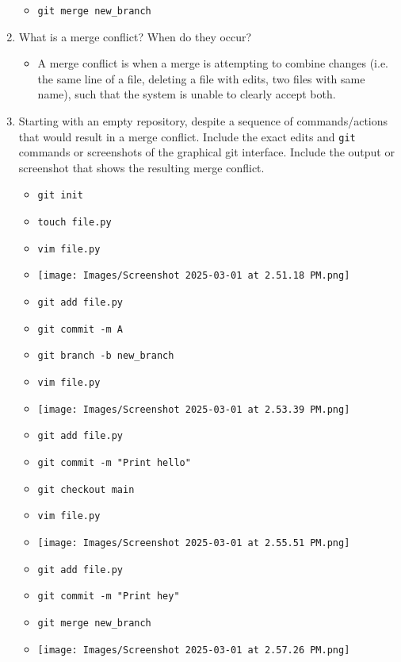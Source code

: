 \documentclass[10pt,twocolumn]{article}
\begin{document}
\begin{enumerate}
        \begin{itemize}
            \item \texttt{git merge new\_branch}
        \end{itemize}
    \item What is a merge conflict? When do they occur?
        \begin{itemize}
            \item A merge conflict is when a merge is attempting to combine changes (i.e. the same line of a file, deleting a file with edits, two files with same name), such that the system is unable to clearly accept both.
        \end{itemize}
    \item Starting with an empty repository, despite a sequence of commands/actions that would result in a merge conflict. Include the exact edits and \texttt{git} commands or screenshots of the graphical git interface. Include the output or screenshot that shows the resulting merge conflict.
        \begin{itemize}
            \item \texttt{git init}
            \item \texttt{touch file.py}
            \item \texttt{vim file.py}
            \item \texttt{[image: Images/Screenshot 2025-03-01 at 2.51.18 PM.png]}
            \item \texttt{git add file.py}
            \item \texttt{git commit -m A}
            \item \texttt{git branch -b new\_branch}
            \item \texttt{vim file.py}
            \item \texttt{[image: Images/Screenshot 2025-03-01 at 2.53.39 PM.png]}
            \item \texttt{git add file.py}
            \item \texttt{git commit -m "Print hello"}
            \item \texttt{git checkout main}
            \item \texttt{vim file.py}
            \item \texttt{[image: Images/Screenshot 2025-03-01 at 2.55.51 PM.png]}
            \item \texttt{git add file.py}
            \item \texttt{git commit -m "Print hey"}
            \item \texttt{git merge new\_branch}
            \item \texttt{[image: Images/Screenshot 2025-03-01 at 2.57.26 PM.png]}
        \end{itemize}
\end{enumerate}
\end{document}
